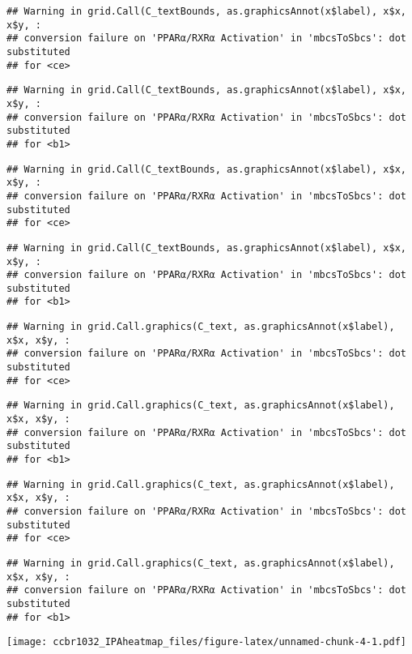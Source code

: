 \documentclass[]{article}
\begin{document}
\begin{verbatim}
## Warning in grid.Call(C_textBounds, as.graphicsAnnot(x$label), x$x, x$y, :
## conversion failure on 'PPARα/RXRα Activation' in 'mbcsToSbcs': dot substituted
## for <ce>
\end{verbatim}

\begin{verbatim}
## Warning in grid.Call(C_textBounds, as.graphicsAnnot(x$label), x$x, x$y, :
## conversion failure on 'PPARα/RXRα Activation' in 'mbcsToSbcs': dot substituted
## for <b1>
\end{verbatim}

\begin{verbatim}
## Warning in grid.Call(C_textBounds, as.graphicsAnnot(x$label), x$x, x$y, :
## conversion failure on 'PPARα/RXRα Activation' in 'mbcsToSbcs': dot substituted
## for <ce>
\end{verbatim}

\begin{verbatim}
## Warning in grid.Call(C_textBounds, as.graphicsAnnot(x$label), x$x, x$y, :
## conversion failure on 'PPARα/RXRα Activation' in 'mbcsToSbcs': dot substituted
## for <b1>
\end{verbatim}

\begin{verbatim}
## Warning in grid.Call.graphics(C_text, as.graphicsAnnot(x$label), x$x, x$y, :
## conversion failure on 'PPARα/RXRα Activation' in 'mbcsToSbcs': dot substituted
## for <ce>
\end{verbatim}

\begin{verbatim}
## Warning in grid.Call.graphics(C_text, as.graphicsAnnot(x$label), x$x, x$y, :
## conversion failure on 'PPARα/RXRα Activation' in 'mbcsToSbcs': dot substituted
## for <b1>
\end{verbatim}

\begin{verbatim}
## Warning in grid.Call.graphics(C_text, as.graphicsAnnot(x$label), x$x, x$y, :
## conversion failure on 'PPARα/RXRα Activation' in 'mbcsToSbcs': dot substituted
## for <ce>
\end{verbatim}

\begin{verbatim}
## Warning in grid.Call.graphics(C_text, as.graphicsAnnot(x$label), x$x, x$y, :
## conversion failure on 'PPARα/RXRα Activation' in 'mbcsToSbcs': dot substituted
## for <b1>
\end{verbatim}

\texttt{[image: ccbr1032\_IPAheatmap\_files/figure-latex/unnamed-chunk-4-1.pdf]}
\end{document}
